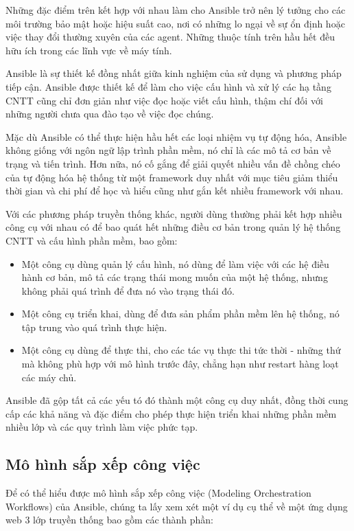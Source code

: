 Những đặc điểm trên kết hợp với nhau làm cho Ansible trở nên lý tưởng cho các môi trường bảo mật hoặc hiệu suất cao, nơi có những lo ngại về sự ổn định hoặc việc thay đổi thường xuyên của các agent. Những thuộc tính trên hầu hết đều hữu ích trong các lĩnh vực về máy tính.

Ansible là sự thiết kế đồng nhất giữa kinh nghiệm của sử dụng và phương pháp tiếp cận. Ansible được thiết kế để làm cho việc cấu hình và xử lý các hạ tầng CNTT cũng chỉ đơn giản như việc đọc hoặc viết cấu hình, thậm chí đối với những người chưa qua đào tạo về việc đọc chúng.

Mặc dù Ansible có thể thực hiện hầu hết các loại nhiệm vụ tự động hóa, Ansible không giống với ngôn ngữ lập trình phần mềm, nó chỉ là các mô tả cơ bản về trạng và tiến trình. Hơn nữa, nó cố gắng để giải quyết nhiều vấn đề chồng chéo của tự động hóa hệ thống từ một framework duy nhất với mục tiêu giảm thiểu thời gian và chi phí để học và hiểu cũng như gắn kết nhiều framework với nhau.

Với các phương pháp truyền thống khác, người dùng thường phải kết hợp nhiều công cụ với nhau có để bao quát hết những điều cơ bản trong quản lý hệ thống CNTT và cấu hình phần mềm, bao gồm:

\begin{itemize}
\item Một công cụ dùng quản lý cấu hình, nó dùng để làm việc với các hệ điều hành cơ bản, mô tả các trạng thái mong muốn của một hệ thống, nhưng không phải quá trình để đưa nó vào trạng thái đó.

\item Một công cụ triển khai, dùng để đưa sản phẩm phần mềm lên hệ thống, nó tập trung vào quá trình thực hiện.

\item Một công cụ dùng để thực thi, cho các tác vụ thực thi tức thời - những thứ mà không phù hợp với mô hình trước đây, chẳng hạn như restart hàng loạt các máy chủ.
\end{itemize}

Ansible đã gộp tất cả các yếu tó đó thành một công cụ duy nhất, đồng thời cung cấp các khả năng và đặc điểm cho phép thực hiện triển khai những phần mềm nhiều lớp và các quy trình làm việc phức tạp.

\subsection{Mô hình sắp xếp công việc}

Để có thể hiểu được mô hình sắp xếp công việc (Modeling Orchestration Workflows) của Ansible, chúng ta lấy xem xét một ví dụ cụ thể về một ứng dụng web 3 lớp truyền thống bao gồm các thành phần:

